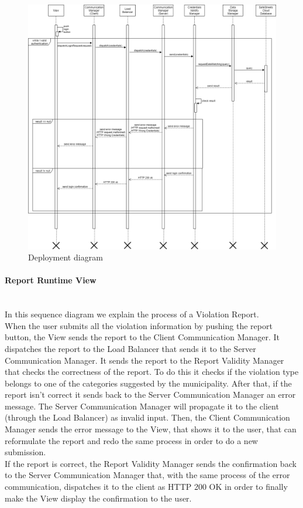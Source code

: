 \documentclass[titlepage]{article}
\begin{document}
\begin{figure}[h]
	\includegraphics[scale=0.42]{Diagrams/Sequence Diagrams/Runtime View Diagram login.png}
	\caption{Deployment diagram}
\end{figure}
\FloatBarrier


\paragraph{Report Runtime View \\ \\}

In this sequence diagram we explain the process of a Violation Report. \\
When the user submits all the violation information by pushing the report button, the View sends the report to the Client Communication Manager. It dispatches the report to the Load Balancer that sends it to the Server Communication Manager. It sends the report to the Report Validity Manager that checks the correctness of the report. To do this it checks if the violation type belongs to one of the categories suggested by the municipality.
After that, if the report isn't correct it sends back to the Server Communication Manager an error message. The Server Communication Manager will propagate it to the client (through the Load Balancer) as invalid input.
Then, the Client Communication Manager sends the error message to the View, that shows it to the user, that can reformulate the report and redo the same process in order to do a new submission. \\
If the report is correct, the Report Validity Manager sends the confirmation back to the Server Communication Manager that, with the same process of the error communication, dispatches it to the client as HTTP 200 OK in order to finally make the View display the confirmation to the user. \\
\end{document}
